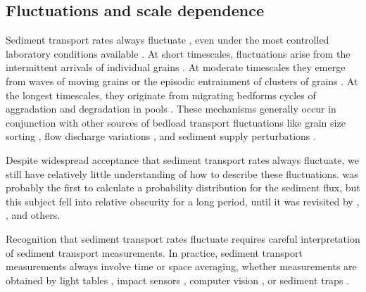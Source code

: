 \subsection{Fluctuations and scale dependence}

Sediment transport rates always fluctuate \citep{Kuhnle1988,Hoey1992,Recking2012}, even under the most controlled laboratory conditions available \citep{Ancey2006,Roseberry2012}.
At short timescales, fluctuations arise from the intermittent arrivals of individual grains \citep{Bohm2004,Ballio2018}. At moderate timescales they emerge from waves of moving grains \citep{Heyman2014} or the episodic entrainment of clusters of grains \citep{Strom2004,Papanicolaou2018}. At the longest timescales, they originate from migrating bedforms \citep{Guala2014}\DIFdelbegin {}\DIFdelend \DIFaddbegin \DIFadd{, }\DIFaddend cycles of aggradation and degradation in pools \citep{Dhont2018}.
These mechanisms generally occur in conjunction with other sources of bedload transport fluctuations like grain size sorting \citep{Iseya1987,Cudden2003}, flow discharge variations \citep{Wong2006,Mao2012,Redolfi2018}, and sediment supply perturbations \citep{Lisle1993,Madej2009,Elgueta-Astaburuaga2019}.

Despite widespread acceptance that sediment transport rates always fluctuate, we still have relatively little understanding of how to describe these fluctuations.
\citet{Hamamori1962} was probably the first to calculate a probability distribution for the sediment flux, but this subject fell into relative obscurity for a long period, until it was revisited by \citet{Nikora1997}, \DIFaddbegin {}\DIFaddend \citet{Ancey2006}, and others.

Recognition that sediment transport rates fluctuate requires careful interpretation of sediment transport measurements. 
In practice, sediment transport measurements always involve time or space averaging, whether measurements are obtained by light tables \DIFdelbegin {}\DIFdelend \DIFaddbegin {}\DIFaddend , impact sensors \DIFdelbegin {}\DIFdelend \DIFaddbegin {}\DIFaddend , computer vision \DIFdelbegin {}\DIFdelend \DIFaddbegin {}\DIFaddend , or sediment traps \DIFdelbegin {}\DIFdelend \DIFaddbegin {}\DIFaddend .

